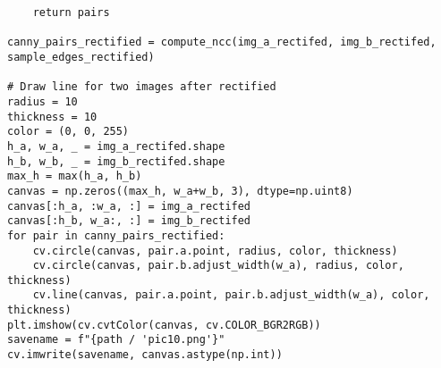 \documentclass[11pt]{article}
\begin{document}
\begin{lstlisting}
    return pairs

canny_pairs_rectified = compute_ncc(img_a_rectifed, img_b_rectifed, sample_edges_rectified)

# Draw line for two images after rectified
radius = 10
thickness = 10
color = (0, 0, 255)
h_a, w_a, _ = img_a_rectifed.shape
h_b, w_b, _ = img_b_rectifed.shape
max_h = max(h_a, h_b)
canvas = np.zeros((max_h, w_a+w_b, 3), dtype=np.uint8)
canvas[:h_a, :w_a, :] = img_a_rectifed
canvas[:h_b, w_a:, :] = img_b_rectifed
for pair in canny_pairs_rectified:
    cv.circle(canvas, pair.a.point, radius, color, thickness)
    cv.circle(canvas, pair.b.adjust_width(w_a), radius, color, thickness)
    cv.line(canvas, pair.a.point, pair.b.adjust_width(w_a), color, thickness)
plt.imshow(cv.cvtColor(canvas, cv.COLOR_BGR2RGB))
savename = f"{path / 'pic10.png'}"
cv.imwrite(savename, canvas.astype(np.int))

\end{lstlisting}

\end{document}
